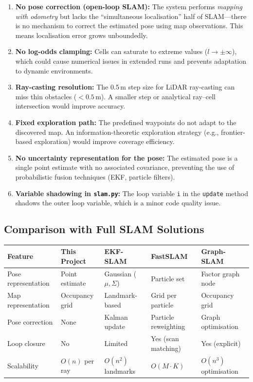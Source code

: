 \documentclass[12pt,a4paper]{article}
\begin{document}
\begin{enumerate}
    \item \textbf{No pose correction (open-loop SLAM):} The system performs \emph{mapping with odometry} but lacks the ``simultaneous localisation'' half of SLAM---there is no mechanism to correct the estimated pose using map observations. This means localisation error grows unboundedly.

    \item \textbf{No log-odds clamping:} Cells can saturate to extreme values (\(l \to \pm\infty\)), which could cause numerical issues in extended runs and prevents adaptation to dynamic environments.

    \item \textbf{Ray-casting resolution:} The 0.5\,m step size for LiDAR ray-casting can miss thin obstacles ($< 0.5$\,m). A smaller step or analytical ray--cell intersection would improve accuracy.

    \item \textbf{Fixed exploration path:} The predefined waypoints do not adapt to the discovered map. An information-theoretic exploration strategy (e.g., frontier-based exploration) would improve coverage efficiency.

    \item \textbf{No uncertainty representation for the pose:} The estimated pose is a single point estimate with no associated covariance, preventing the use of probabilistic fusion techniques (EKF, particle filters).

    \item \textbf{Variable shadowing in \texttt{slam.py}:} The loop variable \texttt{i} in the \texttt{update} method shadows the outer loop variable, which is a minor code quality issue.
\end{enumerate}

\subsection{Comparison with Full SLAM Solutions}

\begin{table}[H]
\centering
\small
\begin{tabular}{@{}p{2.8cm}p{2.5cm}p{2.5cm}p{2.8cm}p{2.8cm}@{}}
\toprule
\textbf{Feature} & \textbf{This Project} & \textbf{EKF-SLAM} & \textbf{FastSLAM} & \textbf{Graph-SLAM} \\
\midrule
Pose representation & Point estimate & Gaussian (\(\mu, \Sigma\)) & Particle set & Factor graph node \\[3pt]
Map representation & Occupancy grid & Landmark-based & Grid per particle & Occupancy grid \\[3pt]
Pose correction & None & Kalman update & Particle reweighting & Graph optimisation \\[3pt]
Loop closure & No & Limited & Yes (scan matching) & Yes (explicit) \\[3pt]
Scalability & \(O(n)\) per ray & \(O(n^2)\) landmarks & \(O(M \cdot K)\) & \(O(n^3)\) optimisation \\
\bottomrule
\end{tabular}
\end{table}
\end{document}

